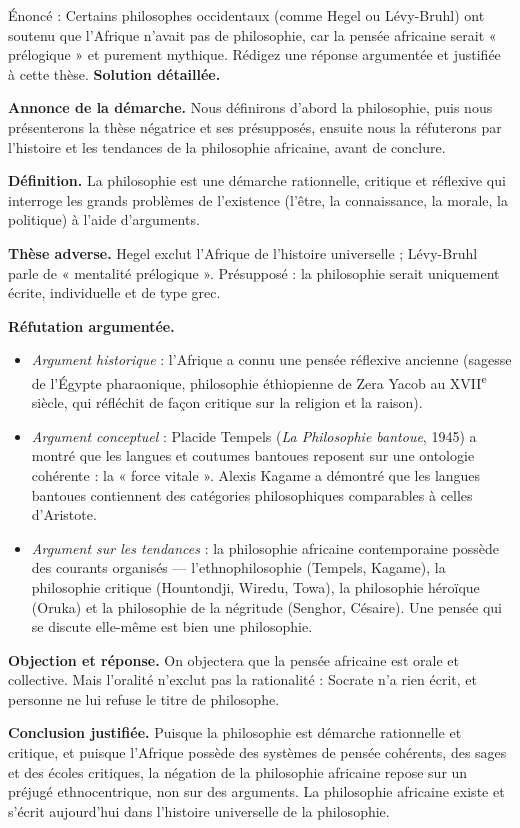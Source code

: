 \documentclass[11pt]{article}
\newcommand{\cle}[1]{{\popxbold\color{popdark}#1}}
\begin{document}
\begin{exoresolu}
Énoncé : Certains philosophes occidentaux (comme Hegel ou Lévy-Bruhl) ont soutenu que l'Afrique n'avait pas de philosophie, car la pensée africaine serait « prélogique » et purement mythique. Rédigez une réponse argumentée et justifiée à cette thèse.
\tcblower
\textbf{Solution détaillée.}

\textbf{Annonce de la démarche.} Nous définirons d'abord la philosophie, puis nous présenterons la thèse négatrice et ses présupposés, ensuite nous la réfuterons par l'histoire et les tendances de la philosophie africaine, avant de conclure.

\textbf{Définition.} La \cle{philosophie} est une démarche rationnelle, critique et réflexive qui interroge les grands problèmes de l'existence (l'être, la connaissance, la morale, la politique) à l'aide d'arguments.

\textbf{Thèse adverse.} Hegel exclut l'Afrique de l'histoire universelle ; Lévy-Bruhl parle de « mentalité prélogique ». Présupposé : la philosophie serait uniquement écrite, individuelle et de type grec.

\textbf{Réfutation argumentée.}
\begin{itemize}
\item \emph{Argument historique} : l'Afrique a connu une pensée réflexive ancienne (sagesse de l'Égypte pharaonique, philosophie éthiopienne de Zera Yacob au XVII\textsuperscript{e} siècle, qui réfléchit de façon critique sur la religion et la raison).
\item \emph{Argument conceptuel} : Placide Tempels (\emph{La Philosophie bantoue}, 1945) a montré que les langues et coutumes bantoues reposent sur une ontologie cohérente : la « force vitale ». Alexis Kagame a démontré que les langues bantoues contiennent des catégories philosophiques comparables à celles d'Aristote.
\item \emph{Argument sur les tendances} : la philosophie africaine contemporaine possède des courants organisés — l'ethnophilosophie (Tempels, Kagame), la philosophie critique (Hountondji, Wiredu, Towa), la philosophie héroïque (Oruka) et la philosophie de la négritude (Senghor, Césaire). Une pensée qui se discute elle-même est bien une philosophie.
\end{itemize}

\textbf{Objection et réponse.} On objectera que la pensée africaine est orale et collective. Mais l'oralité n'exclut pas la rationalité : Socrate n'a rien écrit, et personne ne lui refuse le titre de philosophe.

\textbf{Conclusion justifiée.} Puisque la philosophie est démarche rationnelle et critique, et puisque l'Afrique possède des systèmes de pensée cohérents, des sages et des écoles critiques, la négation de la philosophie africaine repose sur un préjugé ethnocentrique, non sur des arguments. La philosophie africaine existe et s'écrit aujourd'hui dans l'histoire universelle de la philosophie.
\end{exoresolu}
\end{document}

